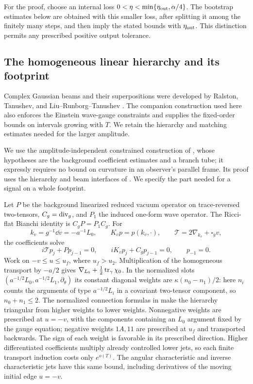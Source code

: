 For the proof, choose an internal loss
$0<\eta<\min\{\eta_{\rm out},\alpha/4\}$. The bootstrap estimates
below are obtained with this smaller loss, after splitting it among
the finitely many steps, and then imply the stated bounds with
$\eta_{\rm out}$. This distinction permits any prescribed positive
output tolerance.

\subsection{The homogeneous linear hierarchy and its footprint}

Complex Gaussian beams and their superpositions were developed by
Ralston, Tanushev, and Liu--Runborg--Tanushev
\cite{Ralston1982,Tanushev2008,LiuRunborgTanushev2013}.
The companion construction used here also enforces the Einstein
wave-gauge constraints and supplies the fixed-order bounds on
intervals growing with $T$. We retain the hierarchy and matching
estimates needed for the larger amplitude.

We use the amplitude-independent constrained construction of
\cite[, ]{KerrCOne}, whose hypotheses are
the background coefficient estimates and a branch tube; it expressly
requires no bound on curvature in an observer's parallel frame.
Its proof uses the hierarchy and beam interfaces of
\cite[, , ]{KerrCTwo}.
We specify the part needed for a signal on a whole footprint.

Let $P$ be the background linearized reduced vacuum operator on
trace-reversed two-tensors, $C_g=\operatorname{div}_g$, and $P_1$ the induced
one-form wave operator. The Ricci-flat Bianchi identity is
$C_gP=P_1C_g$. For
\[
 k_v=g^{-1}\dd v=-a^{-1}L_0,\qquad
 K_vp=p(k_v,\cdot),\qquad
 \mathcal T=2\nabla_{k_v}+\square_gv,
\]
the coefficients solve
\begin{equation}\label{pk:hierarchy}
 i\mathcal T p_j+Pp_{j-1}=0,\qquad
 iK_vp_j+C_gp_{j-1}=0,\qquad p_{-1}=0.
\end{equation}
Work on $-v\le u\le u_f$, where $u_f>u_2$. Multiplication of the
homogeneous transport by $-a/2$ gives
$\nabla_{L_0}+\tfrac12\operatorname{tr}_\gamma\chi_0$. In the normalized slots
$(a^{-1/2}L_0,a^{-1/2}L_1,\partial_\theta)$ its constant diagonal
weights are $\kappa(n_0-n_1)/2$: here $n_i$ counts the arguments of
type $a^{-1/2}L_i$ in a covariant two-tensor component, so
$n_0+n_1\le2$. The normalized connection formulas
in \cite[]{KerrCTwo} make the hierarchy triangular from
higher weights to lower weights. Nonnegative weights are prescribed
at $u=-v$, with the components containing an $L_0$ argument fixed
by the gauge equation;
negative weights $1A,11$ are prescribed at $u_f$ and transported
backwards. The sign of each weight is favorable in its prescribed
direction. Higher differentiated coefficients multiply already
controlled lower jets, so each finite transport induction costs
only $e^{o(T)}$. The angular characteristic and inverse
characteristic jets have this same bound, including derivatives
of the moving initial edge $u=-v$.

